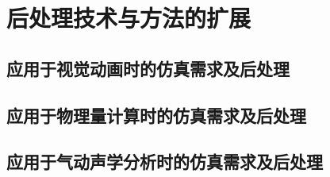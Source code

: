 \chapter{后处理技术与方法的扩展}
\label{chap:caa}

\section{应用于视觉动画时的仿真需求及后处理}

\section{应用于物理量计算时的仿真需求及后处理}

\section{应用于气动声学分析时的仿真需求及后处理}